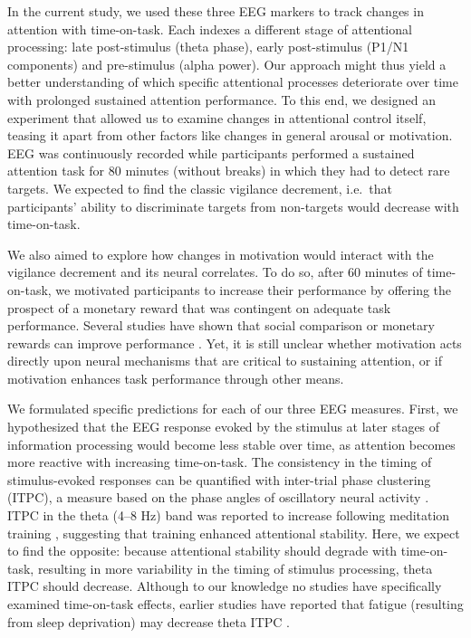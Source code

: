 \documentclass[11pt,english,]{memoir}
\begin{document}
In the current study, we used these three EEG markers to track changes in attention with time-on-task. Each indexes a different stage of attentional processing: late post-stimulus (theta phase), early post-stimulus (P1/N1 components) and pre-stimulus (alpha power). Our approach might thus yield a better understanding of which specific attentional processes deteriorate over time with prolonged sustained attention performance. To this end, we designed an experiment that allowed us to examine changes in attentional control itself, teasing it apart from other factors like changes in general arousal or motivation. EEG was continuously recorded while participants performed a sustained attention task for 80 minutes (without breaks) in which they had to detect rare targets. We expected to find the classic vigilance decrement, i.e.~that participants' ability to discriminate targets from non-targets would decrease with time-on-task.

We also aimed to explore how changes in motivation would interact with the vigilance decrement and its neural correlates. To do so, after 60 minutes of time-on-task, we motivated participants to increase their performance by offering the prospect of a monetary reward that was contingent on adequate task performance. Several studies have shown that social comparison or monetary rewards can improve performance \autocites{Bonnefond2011}{Hopstaken2015}{Boksem2006}{Lorist2009}. Yet, it is still unclear whether motivation acts directly upon neural mechanisms that are critical to sustaining attention, or if motivation enhances task performance through other means.

We formulated specific predictions for each of our three EEG measures. First, we hypothesized that the EEG response evoked by the stimulus at later stages of information processing would become less stable over time, as attention becomes more reactive with increasing time-on-task. The consistency in the timing of stimulus-evoked responses can be quantified with inter-trial phase clustering (ITPC), a measure based on the phase angles of oscillatory neural activity \autocite{VanRullen2011}. ITPC in the theta (4--8 Hz) band was reported to increase following meditation training \autocites{Lutz2009}{Slagter2009}, suggesting that training enhanced attentional stability. Here, we expect to find the opposite: because attentional stability should degrade with time-on-task, resulting in more variability in the timing of stimulus processing, theta ITPC should decrease. Although to our knowledge no studies have specifically examined time-on-task effects, earlier studies have reported that fatigue (resulting from sleep deprivation) may decrease theta ITPC \autocites{Eidelman-Rothman2018}{Hoedlmoser2011}.
\end{document}
